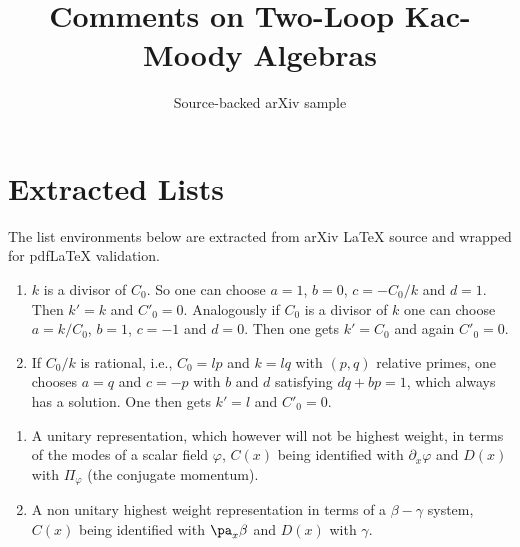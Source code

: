 \documentclass[11pt]{article}
\title{Comments on Two-Loop Kac-Moody Algebras}
\author{Source-backed arXiv sample}
\date{}
\begin{document}
\maketitle
\section{Extracted Lists}

The list environments below are extracted from arXiv LaTeX source and wrapped for pdfLaTeX validation.

\begin{enumerate}
\item $k$ is a divisor of $C_0$. So one can choose $a=1$, $b=0$, $c= -C_0/k$
and
$d=1$. Then $k'=k$ and ${C'}_0 = 0$. Analogously if $C_0$ is a
divisor of $k$ one can choose $a=k/{C_0}$, $b=1$, $c=-1$ and $d=0$. Then
one gets $k'=C_0$ and again ${C'}_0 = 0$.
\item If $C_0/k$ is rational, i.e., $C_0 = l p$ and $k = l q$ with $(p,q)$
relative primes, one chooses $a=q$ and $c=-p$ with $b$ and $d$ satisfying $dq +
b p = 1$, which always has a solution. One then gets $k'=l$ and
${C'}_0 = 0$.
\end{enumerate}

\begin{enumerate}
\item A unitary representation, which however will not be highest weight, in
terms of the modes of a scalar field $\varphi$, $C(x)$ being identified with
$\partial_x \varphi$ and $D(x)$ with $\Pi _{\varphi}$ (the conjugate momentum).
\item A non unitary highest weight representation in terms of a $\beta -
\gamma$ system\cite{friedan}, $C(x)$ being identified with $\pa_x \beta$ and
$D(x)$ with $\gamma$.
\end{enumerate}
\end{document}
